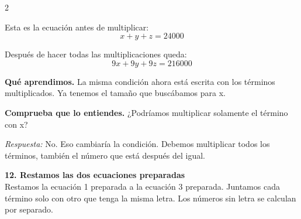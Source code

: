 \documentclass[11pt,a4paper,landscape]{article}
\begin{document}
\begin{multicols*}{2}
\begin{minipage}{\linewidth}
\par\smallskip Esta es la ecuación antes de multiplicar:
\[x + y + z = 24000\]
\par{}\par\smallskip
\par\smallskip Después de hacer todas las multiplicaciones queda:
\[9x + 9y + 9z = 216000\]
\par\smallskip\textbf{Qué aprendimos.} La misma condición ahora está escrita con los términos multiplicados. Ya tenemos el tamaño que buscábamos para x.
\par\smallskip\textbf{Comprueba que lo entiendes.} ¿Podríamos multiplicar solamente el término con x?\par\textit{Respuesta:} No. Eso cambiaría la condición. Debemos multiplicar todos los términos, también el número que está después del igual.
\end{minipage}\par\medskip
\noindent\begin{minipage}{\linewidth}\textbf{12. Restamos las dos ecuaciones preparadas}\\[2pt]Restamos la ecuación 1 preparada a la ecuación 3 preparada. Juntamos cada término solo con otro que tenga la misma letra. Los números sin letra se calculan por separado.
\par{}\par\smallskip

\end{minipage}
\end{multicols*}
\end{document}
